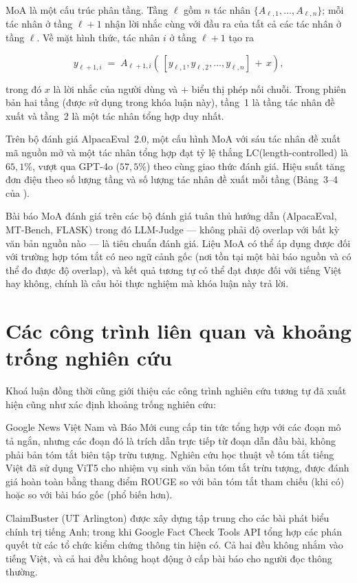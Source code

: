 MoA là một cấu trúc phân tầng. Tầng $\ell$ gồm $n$ tác nhân
$\{A_{\ell,1}, \ldots, A_{\ell,n}\}$; mỗi tác nhân ở tầng $\ell+1$
nhận lời nhắc cùng với đầu ra của tất cả các tác nhân ở tầng $\ell$.
Về mặt hình thức, tác nhân $i$ ở tầng $\ell+1$ tạo ra

\[
y_{\ell+1,i} \;=\; A_{\ell+1,i}\!\left(\,[y_{\ell,1}, y_{\ell,2},
\ldots, y_{\ell,n}]\,+\,x\right),
\]

\noindent trong đó $x$ là lời nhắc của người dùng và $+$ biểu thị
phép nối chuỗi. Trong phiên bản hai tầng (được sử dụng trong khóa
luận này), tầng~1 là tầng tác nhân đề xuất và tầng~2 là một
tác nhân tổng hợp duy nhất.

Trên bộ đánh giá AlpacaEval~2.0, một cấu hình MoA với sáu tác nhân
đề xuất mã nguồn mở và một tác nhân tổng hợp đạt tỷ lệ thắng LC(length-controlled) là
$65,1\%$, vượt qua GPT-4o ($57,5\%$) theo cùng giao thức đánh giá.
Hiệu suất tăng đơn điệu theo số lượng tầng và số lượng tác nhân đề
xuất mỗi tầng (Bảng~3--4 của \cite{Wang2024}).

Bài báo MoA đánh giá trên các bộ đánh giá tuân thủ hướng dẫn
(AlpacaEval, MT-Bench, FLASK) trong đó LLM-Judge --- không phải
độ overlap với bất kỳ văn bản nguồn nào --- là tiêu chuẩn đánh giá.
Liệu MoA có thể áp dụng được đối với trường hợp tóm tắt có neo ngữ cảnh gốc
(nơi tồn tại một bài báo nguồn và có thể đo được độ overlap), và kết quả tương tự 
có thể đạt được đối với tiếng Việt hay không, chính là câu hỏi
thực nghiệm mà khóa luận này trả lời.

\section{Các công trình liên quan và khoảng trống nghiên cứu}
Khoá luận đồng thời cũng giới thiệu các công trình nghiên cứu tương tự đã xuất hiện cũng như xác định
khoảng trống nghiên cứu: 

Google News Việt Nam và Báo Mới cung cấp tin tức
tổng hợp với các đoạn mô tả ngắn, nhưng các đoạn đó là trích dẫn trực
tiếp từ đoạn dẫn đầu bài, không phải bản tóm tắt biên tập trừu tượng.
Nghiên cứu học thuật về tóm tắt tiếng Việt đã sử dụng ViT5
\cite{Nguyen2022} cho nhiệm vụ sinh văn bản tóm tắt trừu tượng, được đánh giá
hoàn toàn bằng thang điểm ROUGE so với bản tóm tắt tham chiếu (khi có)
hoặc so với bài báo gốc (phổ biến hơn).

ClaimBuster (UT Arlington) được xây dựng tập trung cho các bài 
phát biểu chính trị tiếng Anh; trong khi Google Fact
Check Tools API tổng hợp các phán quyết từ các tổ chức kiểm chứng
thông tin hiện có. Cả hai đều không nhắm vào tiếng Việt, và cả hai
đều không hoạt động ở cấp bài báo cho người đọc thông thường.

